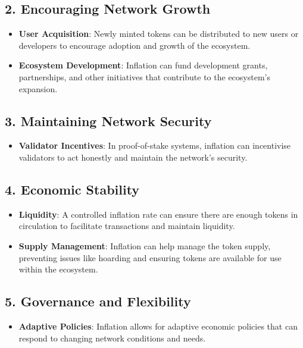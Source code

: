 \documentclass{tufte-handout}
\begin{document}
\subsection*{2. Encouraging Network Growth}
\begin{itemize}
    \item \textbf{User Acquisition}: Newly minted tokens can be distributed to new users or developers to encourage adoption and growth of the ecosystem.
    \item \textbf{Ecosystem Development}: Inflation can fund development grants, partnerships, and other initiatives that contribute to the ecosystem's expansion.
\end{itemize}

\subsection*{3. Maintaining Network Security}
\begin{itemize}
    \item \textbf{Validator Incentives}: In proof-of-stake systems, inflation can incentivise validators to act honestly and maintain the network's security.
\end{itemize}

\subsection*{4. Economic Stability}
\begin{itemize}
    \item \textbf{Liquidity}: A controlled inflation rate can ensure there are enough tokens in circulation to facilitate transactions and maintain liquidity.
    \item \textbf{Supply Management}: Inflation can help manage the token supply, preventing issues like hoarding and ensuring tokens are available for use within the ecosystem.
\end{itemize}

\subsection*{5. Governance and Flexibility}
\begin{itemize}
    \item \textbf{Adaptive Policies}: Inflation allows for adaptive economic policies that can respond to changing network conditions and needs.
\end{itemize}
\end{document}
